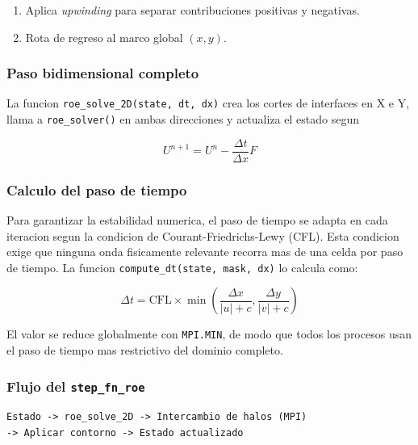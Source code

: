 \documentclass[11pt,a4paper]{article}
\newcommand{\code}[1]{\texttt{#1}}
\begin{document}
\begin{enumerate}[leftmargin=1.8em]
\begin{itemize}
      \item \textbf{Thrust topografico:} formulacion especial para mantener el equilibrio en
            reposo sobre batimetria variable, basada en Murillo y Garc\'{\i}a-Navarro (2010).
      \item \textbf{Friccion de Manning:} $\tau = g\tilde{h}\,S_f\,\Delta x$ con
            $S_f = \dfrac{n^2\sqrt{u^2+v^2}\cdot u}{h^{4/3}}$.
    \end{itemize}
  \item Aplica \emph{upwinding} para separar contribuciones positivas y negativas.
  \item Rota de regreso al marco global $(x, y)$.
\end{enumerate}

\subsubsection{Paso bidimensional completo}

La funcion \code{roe\_solve\_2D(state, dt, dx)} crea los cortes de interfaces en X e Y, llama a
\code{roe\_solver()} en ambas direcciones y actualiza el estado segun

\[
  U^{n+1} = U^n - \frac{\Delta t}{\Delta x}F
\]

\subsubsection{Calculo del paso de tiempo}

Para garantizar la estabilidad numerica, el paso de tiempo se adapta en cada iteracion segun la
condicion de Courant-Friedrichs-Lewy (CFL). Esta condicion exige que ninguna onda fisicamente
relevante recorra mas de una celda por paso de tiempo. La funcion
\code{compute\_dt(state, mask, dx)} lo calcula como:

\[
  \Delta t = \mathrm{CFL} \times \min\left(\frac{\Delta x}{|u| + c},\frac{\Delta y}{|v| + c}\right)
\]

El valor se reduce globalmente con \code{MPI.MIN}, de modo que todos los procesos usan el
paso de tiempo mas restrictivo del dominio completo.

\subsubsection{Flujo del \code{step\_fn\_roe}}

\begin{Verbatim}[fontsize=\small]
Estado -> roe_solve_2D -> Intercambio de halos (MPI)
-> Aplicar contorno -> Estado actualizado
\end{Verbatim}
\end{document}
